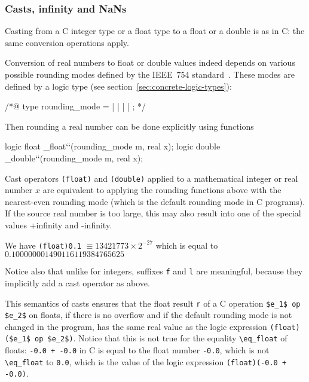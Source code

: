 \subsubsection{Casts, infinity and NaNs}

Casting from a C integer type or a float type to a float
or a double is as in C: the same conversion operations apply.

Conversion of real numbers to float or double values indeed depends on
various possible rounding modes defined by the IEEE~754
standard~\cite{float-std,wikipedia-float}. These modes are defined by
a logic type (see section~\ref{sec:concrete-logic-types}):
\begin{listing-nonumber}
/*@ type rounding_mode = \Up | \Down | \ToZero | \NearestAway | \NearestEven;
*/
\end{listing-nonumber}
Then rounding a real number can be done explicitly using functions
\begin{listing-nonumber}
  logic float \round_float``(rounding_mode m, real x);
  logic double \round_double``(rounding_mode m, real x);
\end{listing-nonumber}
Cast operators \lstinline|(float)| and \lstinline|(double)| applied to a
mathematical integer or real number $x$ are equivalent to applying the
rounding functions above with the nearest-even rounding mode (which is
the default rounding mode in C programs).
If the source real number is too large, this may also result into one
of the special values +infinity and -infinity.
\begin{example}
  We have
  \lstinline|(float)0.1| $\equiv 13421773 \times 2 ^{-27}$ which is equal to
  $0.100000001490116119384765625$
\end{example}
Notice also that unlike for integers, suffixes \lstinline|f| and
\lstinline|l| are
meaningful, because they implicitly add a cast operator as above.

This semantics of casts ensures that the float result \lstinline|r| of
a C operation \lstinline|$e_1$ op $e_2$| on floats, if there is no
overflow and if the default
rounding mode is not changed in the program, has the same real value
as the logic expression \lstinline|(float)($e_1$ op $e_2$)|. Notice
that this is not
true for the equality \lstinline|\eq_float| of floats: \lstinline|-0.0 + -0.0|
in C is equal to the float number \lstinline|-0.0|, which is not
\lstinline|\eq_float| to \lstinline|0.0|, which is the value of the logic
expression \lstinline|(float)(-0.0 + -0.0)|.


